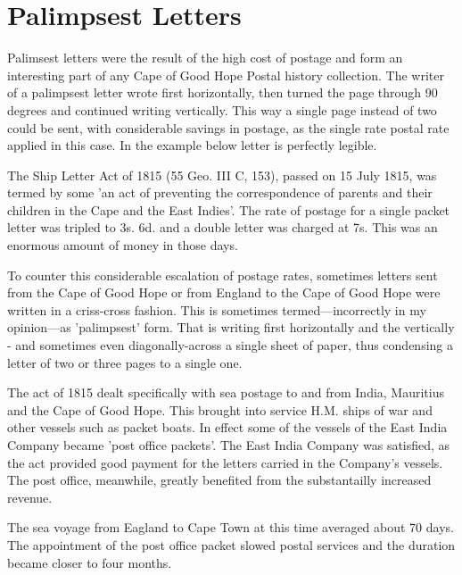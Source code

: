 \section{Palimpsest Letters}

Palimsest letters were the result of the high cost of 
postage and form an interesting part of any Cape of Good Hope 
Postal history collection. The writer of a palimpsest letter wrote first horizontally, 
then turned the page through 90 degrees and continued writing vertically. 
This way a single page instead of two could be sent, 
with considerable savings in postage, as the single rate postal rate applied in this case. 
In the example below letter is perfectly legible.

              
The Ship Letter Act of 1815 (55 Geo. III C, 153), passed on 15 July 1815, 
was termed by some 'an act of preventing the correspondence of parents 
and their children in the Cape and the East Indies'. The rate of 
postage for a single packet letter was tripled to 3s. 6d. and a 
double letter was charged at 7s. This was an enormous amount of 
money in those days.

To counter this considerable escalation of postage rates, 
sometimes letters sent from the Cape of Good Hope or from England 
to the Cape of Good Hope were written in a criss-cross fashion. 
This is sometimes termed---incorrectly in my opinion---as 'palimpsest' form. 
That is writing first horizontally and the vertically - and sometimes 
even diagonally-across a single sheet of paper, thus condensing 
a letter of two or three pages to a single one.

The act of 1815 dealt specifically with sea postage to and from India, 
Mauritius and the Cape of Good Hope. 
This brought into service H.M. ships of war and 
other vessels such as packet boats. In effect some of the vessels of the 
East India Company became 'post office packets'. 
The East India Company was satisfied, as the act provided 
good payment for the letters carried in the Company's vessels. 
The post office, meanwhile, greatly benefited from the 
substantailly increased revenue.

The sea voyage from Eagland to Cape Town at this time averaged about 70 days. 
The appointment of the post office packet slowed postal services and 
the duration became closer to four months.

